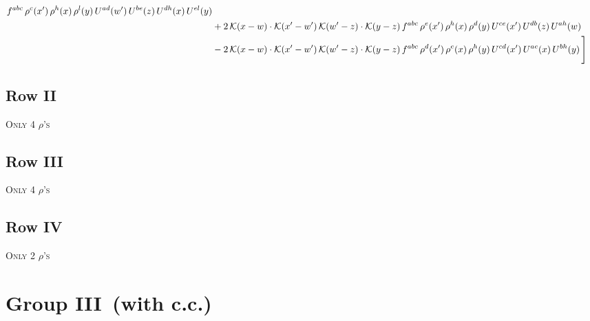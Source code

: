\documentclass[9pt]{article}
\numberwithin{equation}{section}
\begin{document}
\begin{align}
f^{abc}\,\rho^{c}(x')\,\rho^{h}(x)\,\rho^{l}(y)\,U^{ad}(w')\,U^{be}(z)\,U^{dh}(x)\,U^{el}(y)\notag \\ & +2\, \mathcal{K}(x-w)\cdot \mathcal{K}(x'-w')\, \mathcal{K}(w'-z)\cdot \mathcal{K}(y-z)\, f^{abc}\,\rho^{e}(x')\,\rho^{h}(x)\,\rho^{d}(y)\,U^{ce}(x')\,U^{db}(z)\,U^{ah}(w)\notag \\ &  -2\, \mathcal{K}(x-w)\cdot \mathcal{K}(x'-w')\, \mathcal{K}(w'-z)\cdot \mathcal{K}(y-z)\, f^{abc}\,\rho^{d}(x')\,\rho^{e}(x)\,\rho^{h}(y)\,U^{cd}(x')\,U^{ae}(x)\,U^{bh}(y)\,\Bigg]
\end{align}
\subsection{Row II}
\textsc{Only 4 $\rho$'s}
\subsection{Row III}
\textsc{Only 4 $\rho$'s}
\subsection{Row IV}
\textsc{Only 2 $\rho$'s}
\section{Group III\, (with c.c.)}
\end{document}
